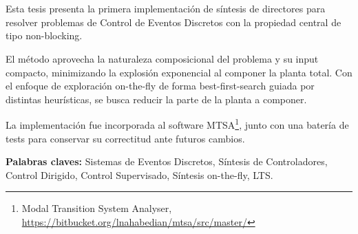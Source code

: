 \chapter*{\runtitulo}

\noindent 

Esta tesis presenta la primera implementación de síntesis de directores para resolver problemas de Control de Eventos Discretos con la propiedad central de tipo non-blocking.

El método aprovecha la naturaleza composicional del problema y su input compacto, minimizando la explosión exponencial al componer la planta total. Con el enfoque de exploración on-the-fly de forma best-first-search guiada por distintas heurísticas, se busca reducir la parte de la planta a componer. 

La implementación fue incorporada al software MTSA\footnote{Modal Transition System Analyser, \href{https://bitbucket.org/lnahabedian/mtsa/src/master/^}{https://bitbucket.org/lnahabedian/mtsa/src/master/}}, junto con una batería de tests para conservar su correctitud ante futuros cambios.
 


%
%

\bigskip

\noindent\textbf{Palabras claves:} Sistemas de Eventos Discretos, Síntesis de Controladores, Control Dirigido, Control Supervisado, Síntesis on-the-fly, LTS.


